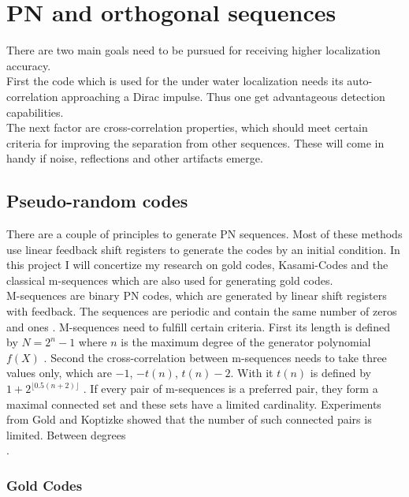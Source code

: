 \chapter{PN and orthogonal sequences}

There are two main goals need to be pursued for receiving higher localization accuracy.\\    
First the code which is used for the under water localization needs its auto-correlation approaching a Dirac impulse. Thus one get advantageous detection capabilities.\\
The next factor are cross-correlation properties, which should meet certain criteria for improving the separation from other sequences. These will come in handy if noise, reflections and other artifacts emerge.

\section{Pseudo-random codes}

There are a couple of principles to generate PN sequences. Most of these methods use linear feedback shift registers to generate the codes by an initial condition. In this project I will concertize my research on gold codes, Kasami-Codes and the classical m-sequences which are also used for generating gold codes.\\
M-sequences are binary PN codes, which are generated by linear shift registers with feedback. The sequences are periodic and contain the same number of zeros and ones \cite{proakis08}. 
M-sequences need to fulfill certain criteria.  First its length is defined by $N=2^n - 1$ where $n$ is the maximum degree of the generator polynomial $f(X)$ \cite{sarwate80}.
Second the cross-correlation between m-sequences needs to take three values only, which are $-1$, $-t(n)$, $t(n) - 2$. With it $t(n)$ is defined by $1+2^{\lfloor0.5(n+2)\rfloor}$ \cite{sarwate80}.
If every pair of m-sequences is a preferred pair, they form a maximal connected set and these sets have a limited cardinality. Experiments from Gold and Koptizke showed that the number of such connected pairs is limited. Between degrees $$$$ \cite{gold65}.


\subsection{Gold Codes}

